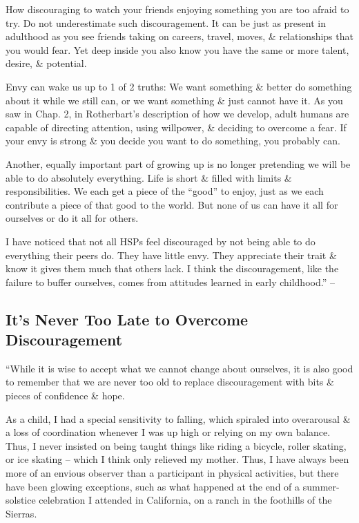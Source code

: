 \documentclass{article}
\numberwithin{equation}{section}
\begin{document}
How discouraging to watch your friends enjoying something you are too afraid to try. Do not underestimate such discouragement. It can be just as present in adulthood as you see friends taking on careers, travel, moves, \& relationships that you would fear. Yet deep inside you also know you have the same or more talent, desire, \& potential.

Envy can wake us up to 1 of 2 truths: We want something \& better do something about it while we still can, or we want something \& just cannot have it. As you saw in Chap. 2, in Rotherbart's description of how we develop, adult humans are capable of directing attention, using willpower, \& deciding to overcome a fear. If your envy is strong \& you decide you want to do something, you probably can.

Another, equally important part of growing up is no longer pretending we will be able to do absolutely everything. Life is short \& filled with limits \& responsibilities. We each get a piece of the ``good'' to enjoy, just as we each contribute a piece of that good to the world. But none of us can have it all for ourselves or do it all for others.

I have noticed that not all HSPs feel discouraged by not being able to do everything their peers do. They have little envy. They appreciate their trait \& know it gives them much that others lack. I think the discouragement, like the failure to buffer ourselves, comes from attitudes learned in early childhood.'' -- \cite[pp. 111--112]{Aron2013}

\subsection{It's Never Too Late to Overcome Discouragement}
``While it is wise to accept what we cannot change about ourselves, it is also good to remember that we are never too old to replace discouragement with bits \& pieces of confidence \& hope.

As a child, I had a special sensitivity to falling, which spiraled into overarousal \& a loss of coordination whenever I was up high or relying on my own balance. Thus, I never insisted on being taught things like riding a bicycle, roller skating, or ice skating -- which I think only relieved my mother. Thus, I have always been more of an envious observer than a participant in physical activities, but there have been glowing exceptions, such as what happened at the end of a summer-solstice celebration I attended in California, on a ranch in the foothills of the Sierras.
\end{document}
